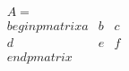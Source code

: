 \documentclass[preview]{standalone}
\begin{document}
\begin{align*}
A = \\begin{pmatrix} a & b & c \\ d & e & f \\end{pmatrix}
\end{align*}
\end{document}
